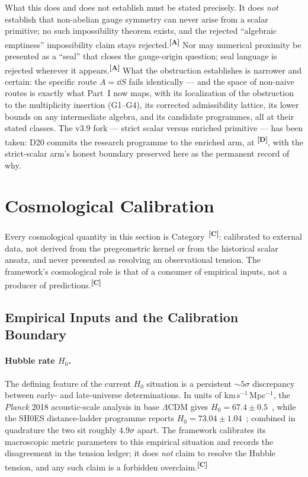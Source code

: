 \documentclass[12pt,a4paper,twoside]{article}
\theoremstyle{plain}
\theoremstyle{definition}
\theoremstyle{remark}
\newcommand{\catmark}[1]{\textsuperscript{\textsf{\textbf{[#1]}}}}
\begin{document}
What this does and does not establish must be stated precisely. It does
\emph{not} establish that non-abelian gauge symmetry can never arise
from a scalar primitive; no such impossibility theorem exists, and the
rejected ``algebraic emptiness'' impossibility claim stays
rejected.\catmark{A} Nor may numerical proximity be presented as a
``seal'' that closes the gauge-origin question; seal language is
rejected wherever it appears.\catmark{A} What the obstruction
establishes is narrower and certain: the specific route $A = \dd S$
fails identically --- and the space of non-naive routes is exactly what
Part~I now maps, with its localization of the obstruction to the
multiplicity insertion (G1--G4), its corrected admissibility lattice,
its lower bounds on any intermediate algebra, and its candidate
programmes, all at their stated classes. The v3.9 fork --- strict scalar
versus enriched primitive --- has been taken: D20 commits the research
programme to the enriched arm, at \catmark{D}, with the strict-scalar
arm's honest boundary preserved here as the permanent record of why.

\section{Cosmological Calibration}
\label{sec:cosmological-calibration}

\noindent Every cosmological quantity in this section is
Category~\catmark{C}: calibrated to external data, not derived from the
pregeometric kernel or from the historical scalar ansatz, and never presented
as resolving an observational tension. The
framework's cosmological role is that of a consumer of empirical inputs,
not a producer of predictions.\catmark{C}

\subsection{Empirical Inputs and the Calibration Boundary}
\label{subsec:cosmology-inputs}

\paragraph{Hubble rate $H_0$.}
The defining feature of the current $H_0$ situation is a persistent
$\sim 5\sigma$ discrepancy between early- and late-universe
determinations. In units of km\,s$^{-1}$\,Mpc$^{-1}$, the
\textit{Planck} 2018 acoustic-scale analysis in base $\Lambda$CDM gives
$H_0 = 67.4 \pm 0.5$~\cite{planck2018}, while the SH0ES
distance-ladder programme reports $H_0 = 73.04 \pm
1.04$~\cite{riess2022}; combined in quadrature the two sit roughly
$4.9\sigma$ apart. The framework
calibrates its macroscopic metric parameters to this empirical situation
and records the disagreement in the tension ledger; it does \emph{not}
claim to resolve the Hubble tension, and any such claim is a forbidden
overclaim.\catmark{C}
\end{document}
